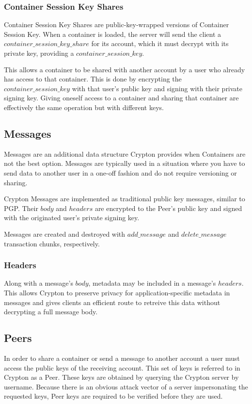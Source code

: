 \documentclass[conference]{IEEEtran}
\begin{document}
\subsubsection{Container Session Key Shares}
Container Session Key Shares are public-key-wrapped versions of Container Session Key.
When a container is loaded, the server will send the client a 
\(container\_session\_key\_share\) for its account, which it must decrypt with
its private key, providing a \(container\_session\_key\).

This allows a container to be shared with another account by a user who
already has access to that container. This is done by encrypting the
\(container\_session\_key\) with that user's public key and signing with their
private signing key. Giving oneself access to a container and sharing that
container are effectively the same operation but with different keys.

\subsection{Messages}
Messages are an additional data structure Crypton provides when Containers
are not the best option. Messages are typically used in a situation where you have to send
data to another user in a one-off fashion and do not require versioning or
sharing.

Crypton Messages are implemented as traditional public key messages, similar to PGP.
Their \(body\) and \(headers\) are encrypted to the Peer's public key and signed
with the originated user's private signing key.

Messages are created and destroyed with \(add\_message\) and \(delete\_message\)
transaction chunks, respectively.

\subsubsection{Headers}
Along with a message's \(body\), metadata may be included in a message's
\(headers\). This allows Crypton to preserve privacy for application-specific
metadata in messages and gives clients an efficient route to retreive this data
without decrypting a full message body.

\subsection{Peers}
In order to share a container or send a message to another account
a user must access the public keys of the receiving account. This set of
keys is referred to in Crypton as a Peer. These keys are obtained by querying the
Crypton server by username. Because there is an obvious attack vector of a server
impersonating the requested keys, Peer keys are required to be verified before
they are used.
\end{document}
